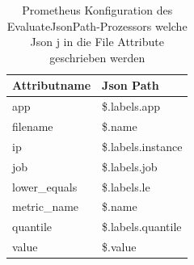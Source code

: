 \begin{table}[H]
    \centering
    {%
    \renewcommand{\arraystretch}{1}
    \begin{longtable}{
        |>{\raggedright\arraybackslash}p{5cm}
        |>{\raggedright\arraybackslash}p{5cm}|
        }
        \hline
        Attributname & Json Path \\
        \hline
        app & \$.labels.app \\
        \hline
        filename & \$.name \\
        \hline
        ip & \$.labels.instance \\
        \hline
        job & \$.labels.job \\
        \hline
        lower\_equals & \$.labels.le \\
        \hline
        metric\_name & \$.name \\
        \hline
        quantile & \$.labels.quantile \\
        \hline 
        value & \$.value \\ 
        \hline
    \end{longtable}
    }
    \caption{Prometheus Konfiguration des EvaluateJsonPath-Prozessors welche Json j in die File Attribute geschrieben werden}
    \label{tab:prometheus-attribute}
\end{table}